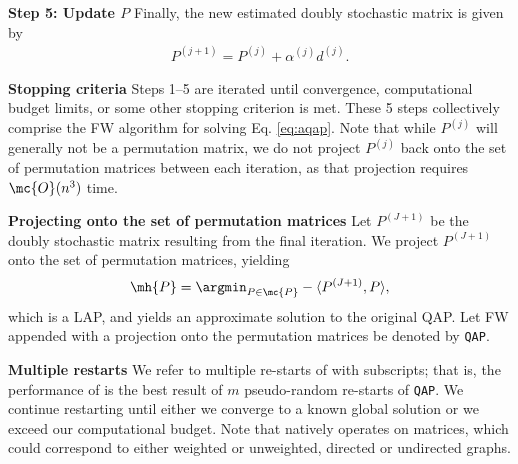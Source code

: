 \documentclass[10pt,journal,cspaper,compsoc]{IEEEtran}
\newcommand{\PmcP}{P \in \mc{P}}
\begin{document}

\textbf{Step 5: Update $P$} Finally, the new estimated doubly stochastic matrix is given by
\begin{align}\label{eq:update}
	P^{(j+1)} = P^{(j)} + \alpha^{(j)} d^{(j)}.
\end{align}


\textbf{Stopping criteria} Steps 1--5 are iterated until convergence, computational budget limits, or some other stopping criterion is met.  These 5 steps collectively comprise the FW algorithm for solving Eq. \eqref{eq:aqap}.  Note that while $P^{(j)}$ will generally not be a permutation matrix, we do not project $P^{(j)}$ back onto the set of permutation matrices between each iteration, as that projection requires $\mc{O}(n^3)$ time.


\textbf{Projecting onto the set of permutation matrices}   Let $P^{(J+1)}$ be the doubly stochastic matrix resulting from the final iteration.  We project $P^{(J+1)}$ onto the set of permutation matrices, yielding
\begin{align} \label{eq:proj}
	\mh{P} = \argmin_{\PmcP} -\langle P^{(J+1)}, P \rangle,
\end{align}
which is a LAP, and yields an approximate solution to the original QAP.  Let FW appended with a projection onto the permutation matrices be denoted by \texttt{QAP}.


\textbf{Multiple restarts} We refer to multiple re-starts of \qap with subscripts; that is, the performance of \qapm is the best result of $m$ pseudo-random re-starts of \texttt{QAP}.  We continue restarting until either we converge to a known global solution or we exceed our computational budget. Note that \qap natively operates on matrices, which could correspond to either weighted or unweighted, directed or undirected graphs.  

% 
\end{document}
